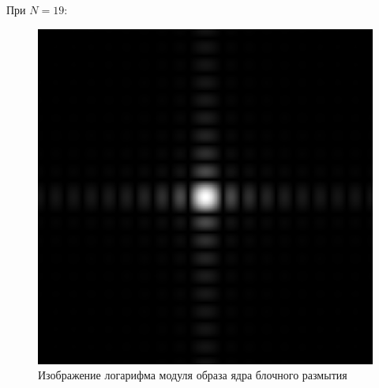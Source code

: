 \documentclass[a4paper]{article}
\begin{document}
При $N = 19$:

\begin{figure}[H]
    \centering
    \includegraphics[width=0.51\linewidth]{2/19_abs_fourier_log_norm_block.png}
    \caption{Изображение логарифма модуля образа ядра блочного размытия}
\end{figure}\
\end{document}

